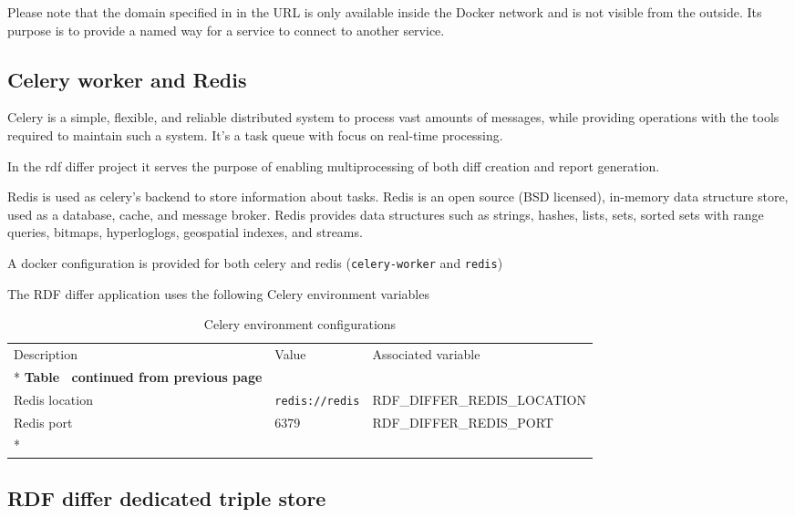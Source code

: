 Please note that the domain specified in in the URL is only available inside the Docker network and is not visible from the outside. Its purpose is to provide a named way for a service to connect to another service. 

\subsection{Celery worker and Redis}
Celery is a simple, flexible, and reliable distributed system to process vast amounts of messages, while providing operations with the tools required to maintain such a system. It’s a task queue with focus on real-time processing.

In the rdf differ project it serves the purpose of enabling multiprocessing of both diff creation and report generation.

Redis is used as celery's backend to store information about tasks.
Redis is an open source (BSD licensed), in-memory data structure store, used as a database, cache, and message broker. Redis provides data structures such as strings, hashes, lists, sets, sorted sets with range queries, bitmaps, hyperloglogs, geospatial indexes, and streams.

A docker configuration is provided for both celery and redis (\texttt{celery-worker} and \texttt{redis})

The RDF differ application uses the following Celery environment variables

\begin{longtable}[c]{@{}p{3.5cm}p{3.5cm}l@{}}
	\toprule
	Description    & Value                  & Associated variable          \\* \midrule
	\endfirsthead
	\multicolumn{3}{c}%
	{{\bfseries Table \thetable\ continued from previous page}}            \\
	\endhead
	\bottomrule
	\endfoot
	\endlastfoot
	Redis location & \texttt{redis://redis} & RDF\_DIFFER\_REDIS\_LOCATION \\
	Redis port     & 6379                   & RDF\_DIFFER\_REDIS\_PORT     \\*\bottomrule
	\caption{Celery environment configurations}
	\label{tab:celery-env}                                                 \\
\end{longtable}
\subsection{RDF differ dedicated triple store}

